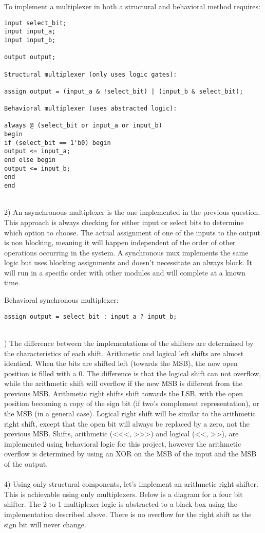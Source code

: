 \documentclass[11pt]{article}
\begin{document}
To implement a multiplexer in both a structural and behavioral method requires:
\begin{lstlisting}
input select_bit;
input input_a;
input input_b;

output output;

Structural multiplexer (only uses logic gates):

assign output = (input_a & !select_bit) | (input_b & select_bit);

Behavioral multiplexer (uses abstracted logic):

always @ (select_bit or input_a or input_b)
begin
if (select_bit == 1'b0) begin
output <= input_a;
end else begin
output <= input_b;
end
end
\end{lstlisting}
\leavevmode \\
2) An asynchronous multiplexer is the one implemented in the previous question. This approach is always checking for either input or select bits to determine which option to choose. The actual assignment of one of the inputs to the output is non blocking, meaning it will happen independent of the order of other operations occurring in the system. A synchronous mux implements the same logic but uses blocking assignments and doesn't necessitate an always block. It will run in a specific order with other modules and will complete at a known time. 

Behavioral synchronous multiplexer:
\begin{lstlisting}
assign output = select_bit : input_a ? input_b;
\end{lstlisting}
\leavevmode \\

) The difference between the implementations of the shifters are determined by the characteristics of each shift. Arithmetic and logical left shifts are almost identical. When the bits are shifted left (towards the MSB), the now open position is filled with a 0. The difference is that the logical shift can not overflow, while the arithmetic shift will overflow if the new MSB is different from the previous MSB. Arithmetic right shifts shift towards the LSB, with the open position becoming a copy of the sign bit (if two's complement representation), or the MSB (in a general case). Logical right shift will be similar to the arithmetic right shift, except that the open bit will always be replaced by a zero, not the previous MSB. Shifts, arithmetic (<<<, >>>) and logical (<<, >>), are implemented using behavioral logic for this project, however the arithmetic overflow is determined by using an XOR on the MSB of the input and the MSB of the output. 
\\ \\
4) Using only structural components, let's implement an arithmetic right shifter. This is achievable using only multiplexers. Below is a diagram for a four bit shifter. The 2 to 1 multiplexer logic is abstracted to a black box using the implementation described above. There is no overflow for the right shift as the sign bit will never change.
\end{document}
